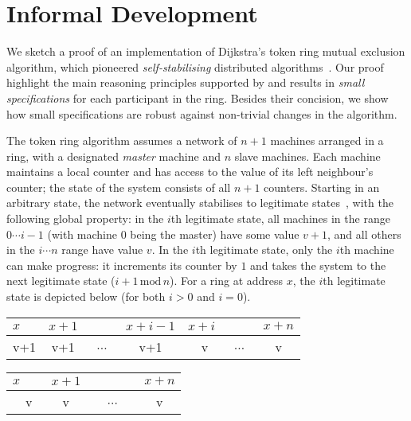 \section{Informal Development}
\label{sec:intuition}

We sketch a proof of an implementation of Dijkstra's token ring mutual
exclusion algorithm, which pioneered \emph{self-stabilising}
distributed algorithms~\cite{dijkstra74}. Our proof highlight the main
reasoning principles supported by \colosl and results in \emph{small
  specifications} for each participant in the ring. Besides their
concision, we show how small specifications are robust against
non-trivial changes in the algorithm.

The token ring algorithm %
assumes a network of $n{+}1$ machines arranged in a ring, with a
designated \emph{master} machine and $n$ slave machines. Each machine maintains a local counter and has
access to the value of its left neighbour's counter; the state of the
system consists of all $n{+}1$ counters. Starting in an arbitrary state,
the network eventually stabilises to legitimate
states~\cite{dijkstra-proof}, with the following global property: 
in the $i$th legitimate state, all machines in the range $0\cdots i{-}1$ (with machine $0$ being the master) have some value $v{+}1$, and all others in the $i \cdots n$ range have value $v$.  In the $i$th legitimate state, only the $i$th machine can make progress: it increments its counter by $1$ and takes the system to the next legitimate state ($i{+}1 \,\text{mod}\, n$). For a ring at address $x$, the $i$th legitimate state is depicted below (for both $i>0$ and $i=0$).  \\ \null\hfill
  \begin{tabular}{lllllll}
    $x$&$x{+}1$&&$x{+}i{-}1$&$x{+}i$&&$x{+}n$
    \\
    \hline
    \multicolumn{1}{|c|}{v+1} &
    \multicolumn{1}{|c|}{v+1} &
    \multicolumn{1}{|c|}{~$\cdots$~} &
    \multicolumn{1}{|c|}{v+1} &
    \multicolumn{1}{|c|}{~~v~\raisebox{1ex}{$\bullet$}} &
    \multicolumn{1}{|c|}{~$\cdots$~} &
    \multicolumn{1}{|c|}{v}\\
    \hline
  \end{tabular}\hfill
  \begin{tabular}{lllllll}
    $x$&$x{+}1$&&&&&$x{+}n$\\
    \hline
    \multicolumn{1}{|c|}{~~v~\raisebox{1ex}{$\bullet$}} &
    \multicolumn{1}{|c|}{v} &
    \multicolumn{4}{|c|}{~$\cdots$~} &
    \multicolumn{1}{|c|}{v}\\
    \hline
  \end{tabular}
  \hfill\null\\


